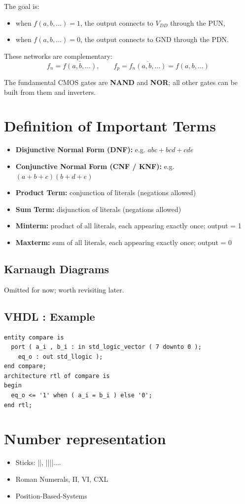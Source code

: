 \documentclass{article}
\begin{document}
The goal is:
\begin{itemize}
  \item when $f(a,b,\dots)=1$, the output connects to $V_{DD}$ through the PUN,
  \item when $f(a,b,\dots)=0$, the output connects to GND through the PDN.
\end{itemize}

These networks are complementary:
\[
f_n = \overline{f(a,b,\dots)}, \qquad f_p = \overline{f_n(a,b,\dots)} = f(a,b,\dots)
\]

The fundamental CMOS gates are \textbf{NAND} and \textbf{NOR}; all other gates can be built from them and inverters.

\section{Definition of Important Terms}
\begin{itemize}
  \item \textbf{Disjunctive Normal Form (DNF):} e.g. $abc + bcd + cde$
  \item \textbf{Conjunctive Normal Form (CNF / KNF):} e.g. $(a+b+c)(b+d+e)$
  \item \textbf{Product Term:} conjunction of literals (negations allowed)
  \item \textbf{Sum Term:} disjunction of literals (negations allowed)
  \item \textbf{Minterm:} product of all literals, each appearing exactly once; output = 1
  \item \textbf{Maxterm:} sum of all literals, each appearing exactly once; output = 0
\end{itemize}

\subsection{Karnaugh Diagrams}
Omitted for now; worth revisiting later.

\subsection{VHDL : Example}
\begin{lstlisting}
entity compare is
  port ( a_i , b_i : in std_logic_vector ( 7 downto 0 );
    eq_o : out std_llogic );
end compare;
architecture rtl of compare is
begin
  eq_o <= '1' when ( a_i = b_i ) else '0';
end rtl;
\end{lstlisting}
\section{Number representation}
\begin{itemize}
  \item Sticks: ||, ||||....
  \item Roman Numerals, II, VI, CXL
  \item Position-Based-Systems
\end{itemize}
\end{document}
